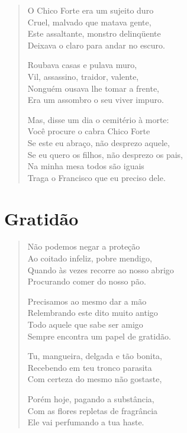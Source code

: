 \begin{verse}
O Chico Forte era um sujeito duro\\
Cruel, malvado que matava gente,\\
Este assaltante, monstro delinqüente\\
Deixava o claro para andar no escuro.

Roubava casas e pulava muro,\\
Vil, assassino, traidor, valente,\\
Nonguém ousava lhe tomar a frente,\\
Era um assombro o seu viver impuro.

Mas, disse um dia o cemitério à morte:\\
Você procure o cabra Chico Forte\\
Se este eu abraço, não desprezo aquele,\\

Se eu quero os filhos, não desprezo os pais,\\
Na minha mesa todos são iguais\\
Traga o Francisco que eu preciso dele.
\end{verse}

\chapter{Gratidão}

\begin{verse}
Não podemos negar a proteção\\
Ao coitado infeliz, pobre mendigo,\\
Quando às vezes recorre ao nosso abrigo\\
Procurando comer do nosso pão.

Precisamos ao mesmo dar a mão\\
Relembrando este dito muito antigo\\
Todo aquele que sabe ser amigo\\
Sempre encontra um papel de gratidão.

Tu, mangueira, delgada e tão bonita,\\
Recebendo em teu tronco parasita\\
Com certeza do mesmo não gostaste,

Porém hoje, pagando a substância,\\
Com as flores repletas de fragrância\\
Ele vai perfumando a tua haste.
\end{verse}

